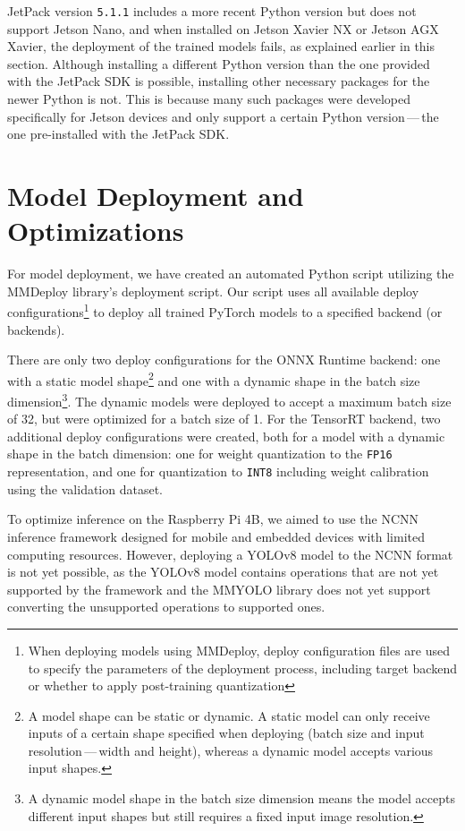 JetPack version \texttt{5.1.1} includes a more recent Python version but does
not support Jetson Nano, and when installed on Jetson Xavier NX or Jetson AGX
Xavier, the deployment of the trained models fails, as explained earlier in this
section. Although installing a different Python version than the one provided
with the JetPack SDK is possible, installing other necessary packages for the
newer Python is not. This is because many such packages were developed
specifically for Jetson devices and only support a certain Python
version\,---\,the one pre-installed with the JetPack SDK.


\section{Model Deployment and Optimizations}


For model deployment, we have created an automated Python script utilizing the
MMDeploy library's deployment script. Our script uses all available deploy
configurations\footnote{When deploying models using MMDeploy, deploy
configuration files are used to specify the parameters of the deployment
process, including target backend or whether to apply post-training
quantization} to deploy all trained PyTorch models to a specified backend (or
backends).

There are only two deploy configurations for the ONNX Runtime backend: one
with a static model shape\footnote{A model shape can be static or dynamic. A
static model can only receive inputs of a certain shape specified when deploying
(batch size and input resolution\,---\,width and height), whereas a dynamic model
accepts various input shapes.} and one with a dynamic shape in the batch size
dimension\footnote{A dynamic model shape in the batch size dimension means the
model accepts different input shapes but still requires a fixed input image
resolution.}. The dynamic models were deployed to accept a maximum batch size of
32, but were optimized for a batch size of 1. For the TensorRT backend, two
additional deploy configurations were created, both for a model with a dynamic
shape in the batch dimension: one for weight quantization to the
\texttt{FP16} representation, and one for quantization to \texttt{INT8}
including weight calibration using the validation dataset.

To optimize inference on the Raspberry Pi 4B, we aimed to use the NCNN inference
framework designed for mobile and embedded devices with limited computing
resources. However, deploying a YOLOv8 model to the NCNN format is not yet
possible, as the YOLOv8 model contains operations that are not yet supported by
the framework and the MMYOLO library does not yet support converting the
unsupported operations to supported ones.


